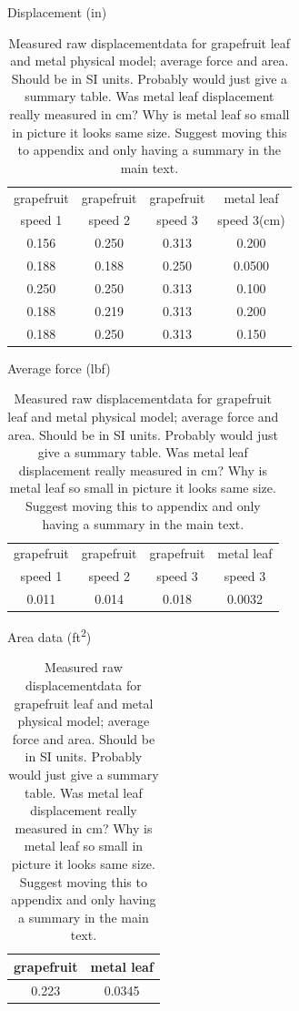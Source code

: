 \documentclass{article}
\begin{document}
\begin{table}
\caption{Measured raw displacementdata for grapefruit leaf and metal physical model; average force and area. Should be in SI units. Probably would just give a summary table. Was metal leaf displacement really measured in \si{\centi\meter}? Why is metal leaf so small in picture it looks same size. Suggest moving this to appendix and only having a summary in the main text.}
\label{tbl:results1}

\begin{center}
Displacement (\si{in})\\
\begin{tabular}{cccc}
\toprule
grapefruit & grapefruit & grapefruit & metal leaf \\
speed 1 & speed 2 & speed 3 & speed 3(cm) \\ 
\midrule
0.156 & 0.250 & 0.313 & 0.200 \\
0.188 & 0.188 & 0.250 & 0.0500 \\
0.250 & 0.250 & 0.313 & 0.100 \\
0.188 & 0.219 & 0.313 & 0.200 \\
0.188 & 0.250 & 0.313 & 0.150 \\
\bottomrule
\end{tabular}
\end{center}

\begin{center}
Average force (\si{lbf})\\
\begin{tabular}{cccc}
\toprule
grapefruit & grapefruit & grapefruit & metal leaf \\
speed 1 & speed 2 & speed 3 & speed 3 \\
\midrule
0.011 & 0.014 & 0.018 & 0.0032\\
\bottomrule
\end{tabular}
\end{center}

\begin{center}
Area data (\si{ft\squared})\\
\begin{tabular}{cc}
\toprule
grapefruit & metal leaf \\ %
\midrule
0.223 & 0.0345 \\ %
\bottomrule
\end{tabular}
\end{center}
\end{table}
\end{document}
